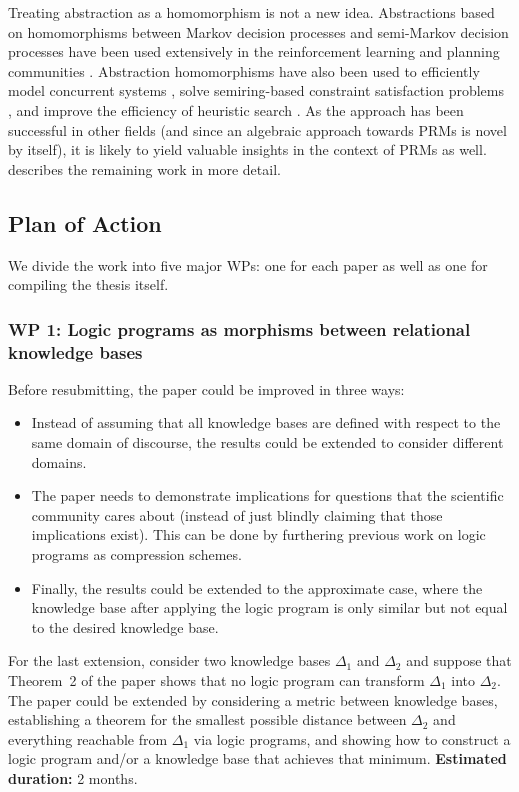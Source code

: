 \documentclass{article}
\begin{document}
Treating abstraction as a homomorphism is not a new idea. Abstractions based on
homomorphisms between Markov decision processes and semi-Markov decision
processes have been used extensively in the reinforcement learning and planning
communities
\cite{DBLP:conf/atal/JiangSL14,DBLP:conf/ijcai/RavindranB03,ravindran2004algebraic}.
Abstraction homomorphisms have also been used to efficiently model concurrent
systems \cite{DBLP:journals/jcss/Castellani87,DBLP:journals/topnoc/DeselM10},
solve semiring-based constraint satisfaction problems
\cite{DBLP:journals/tcs/LiY08}, and improve the efficiency of heuristic search
\cite{DBLP:conf/aaai/HoltePZM96}. As the approach has been successful in other
fields (and since an algebraic approach towards PRMs is novel by itself), it is
likely to yield valuable insights in the context of PRMs as well.
 describes the remaining work in more detail.

\subsection{Plan of Action} \label{sec:plan}

We divide the work into five major WPs: one for each paper as well as one for
compiling the thesis itself.

\subsubsection{WP 1: Logic programs as morphisms between relational knowledge
  bases}

Before resubmitting, the paper could be improved in three ways:
\begin{itemize}
\item Instead of assuming that all knowledge bases are defined with respect to
  the same domain of discourse, the results could be extended to consider
  different domains.
\item The paper needs to demonstrate implications for questions that the
  scientific community cares about (instead of just blindly claiming that those
  implications exist). This can be done by furthering previous work
  \cite{DBLP:conf/ijcai/DumancicGMB19} on logic programs as compression schemes.
\item Finally, the results could be extended to the approximate case, where the
  knowledge base after applying the logic program is only similar but not equal
  to the desired knowledge base.
\end{itemize}
For the last extension, consider two knowledge bases $\Delta_1$ and $\Delta_2$
and suppose that Theorem~2 of the paper shows that no logic program can
transform $\Delta_1$ into $\Delta_2$. The paper could be extended by considering
a metric between knowledge bases, establishing a theorem for the smallest
possible distance between $\Delta_2$ and everything reachable from $\Delta_1$
via logic programs, and showing how to construct a logic program and/or a
knowledge base that achieves that minimum. {\bf Estimated duration:} 2 months.
\end{document}
